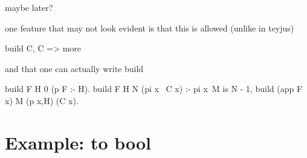 \documentclass[a4paper, 11pt]{book}
\begin{document}
maybe later?

one feature that may not look evident is that
this is allowed (unlike in teyjus)
\begin{elpicode}
build C, C => more
\end{elpicode}

and that one can actually write build

\begin{elpicode}
build F H 0 (p F :- H).
build F H N (pi x \ C x) :-
  pi x\ 
    M is N - 1,
    build (app F x) M (p x,H) (C x).
\end{elpicode}


\section{Example: to bool}
\end{document}
